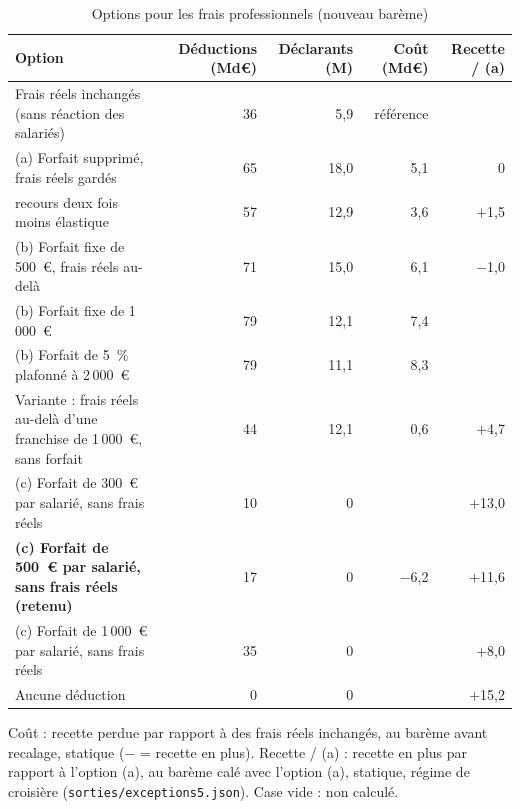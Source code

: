 \begin{table}[h]\centering\footnotesize
\caption{Options pour les frais professionnels (nouveau barème)}\label{tab:ircsg4_frais}
\begin{tabular}{lrrrr}\hline
Option & Déductions (Md€) & Déclarants (M) & Coût (Md€) & Recette / (a) \\ \hline
Frais réels inchangés (sans réaction des salariés) & 36 & 5{,}9 & référence & \\
(a) Forfait supprimé, frais réels gardés & 65 & 18{,}0 & 5{,}1 & 0 \\
\quad recours deux fois moins élastique & 57 & 12{,}9 & 3{,}6 & $+$1{,}5 \\
(b) Forfait fixe de 500~€, frais réels au-delà & 71 & 15{,}0 & 6{,}1 & $-$1{,}0 \\
(b) Forfait fixe de 1\,000~€ & 79 & 12{,}1 & 7{,}4 & \\
(b) Forfait de 5~\% plafonné à 2\,000~€ & 79 & 11{,}1 & 8{,}3 & \\
Variante : frais réels au-delà d'une franchise de 1\,000~€, sans forfait & 44 & 12{,}1 & 0{,}6 & $+$4{,}7 \\
(c) Forfait de 300~€ par salarié, sans frais réels & 10 & 0 & & $+$13{,}0 \\
\textbf{(c) Forfait de 500~€ par salarié, sans frais réels (retenu)} & 17 & 0 & $-$6{,}2 & $+$11{,}6 \\
(c) Forfait de 1\,000~€ par salarié, sans frais réels & 35 & 0 & & $+$8{,}0 \\
Aucune déduction & 0 & 0 & & $+$15{,}2 \\ \hline
\end{tabular}
\par\footnotesize Coût : recette perdue par rapport à des frais réels inchangés, au barème avant recalage, statique ($-$ = recette en plus). Recette / (a) : recette en plus par rapport à l'option (a), au barème calé avec l'option (a), statique, régime de croisière (\texttt{sorties/exceptions5.json}). Case vide : non calculé.
\end{table}


